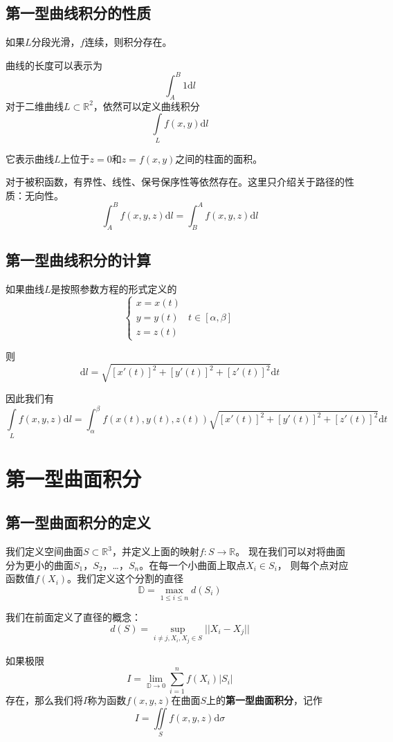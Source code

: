 \documentclass[UTF8,openany]{book}
\begin{document}
	\subsection{第一型曲线积分的性质}
	如果$L$分段光滑，$f$连续，则积分存在。\par
	曲线的长度可以表示为
	$$\int_{A}^{B}1\mathrm{d}l$$
	对于二维曲线$L\subset\mathbb{R}^{2}$，依然可以定义曲线积分
	$$\int\limits_{L}f(x,y)\mathrm{d}l$$\par
	它表示曲线$L$上位于$z=0$和$z=f(x,y)$之间的柱面的面积。\par
	对于被积函数，有界性、线性、保号保序性等依然存在。这里只介绍关于路径的性质：无向性。
	$$\int_{A}^{B}f(x,y,z)\mathrm{d}l=\int_{B}^{A}f(x,y,z)\mathrm{d}l$$
	\subsection{第一型曲线积分的计算}
	如果曲线$L$是按照参数方程的形式定义的
	$$\begin{cases}
	x=x(t)\\y=y(t) & t\in \left[\alpha,\beta\right]\\z=z(t)
	\end{cases}$$\par
	则	$$\mathrm{d}l=\sqrt{\left[x'(t)\right]^2+
	\left[y'(t)\right]^2+\left[z'(t)\right]^2}\mathrm{d}t$$\par
	因此我们有
	$$\int\limits_L f(x,y,z)\mathrm{d}l=
	\int_{\alpha}^{\beta}f\left(x(t),y(t),z(t)\right)\sqrt{\left[x'(t)\right]^2+
	\left[y'(t)\right]^2+\left[z'(t)\right]^2}\mathrm{d}t$$
	\section{第一型曲面积分}
	\subsection{第一型曲面积分的定义}
	我们定义空间曲面$S\subset\mathbb{R}^3$，并定义上面的映射$f:S\rightarrow\mathbb{R}$。
现在我们可以对将曲面分为更小的曲面$S_1$，$S_2$，\ldots，$S_n$。在每一个小曲面上取点$X_i\in S_i$，
则每个点对应函数值$f(X_i)$。我们定义这个分割的直径$$\mathbb{D}=\max_{1\leq i\leq n}d(S_i)$$\par
	我们在前面定义了直径的概念：
	$$d(S)=\sup_{i\neq j,X_i,X_j\in S}||X_i-X_j||$$\par
	如果极限
	$$I=\lim_{\mathbb{D}\rightarrow 0}\sum_{i=1}^{n}f(X_i)|S_i|$$
	存在，那么我们将$I$称为函数$f(x,y,z)$在曲面$S$上的\textbf{第一型曲面积分}，记作
	$$I=\iint\limits_S f(x,y,z)\mathrm{d}\sigma$$
\end{document}

